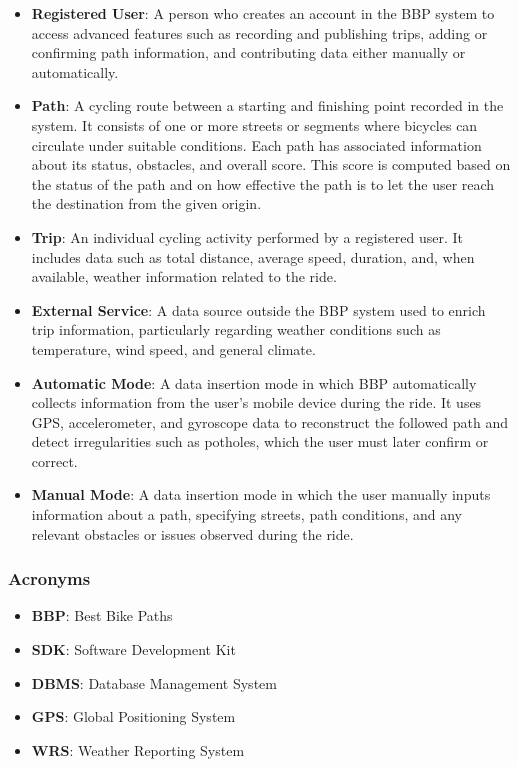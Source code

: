 \begin{itemize}
    \item \textbf{Registered User}: A person who creates an account in the BBP system to access advanced features such as recording and publishing trips, adding or confirming path information, and contributing data either manually or automatically.
    \item \textbf{Path}: A cycling route between a starting and finishing point recorded in the system. It consists of one or more streets or segments where bicycles can circulate under suitable conditions. Each path has associated information about its status, obstacles, and overall score. This score is computed based on the status of the path and on how effective the path is to let the user reach the destination from the given origin.
    \item \textbf{Trip}: An individual cycling activity performed by a registered user. It includes data such as total distance, average speed, duration, and, when available, weather information related to the ride.
    \item \textbf{External Service}: A data source outside the BBP system used to enrich trip information, particularly regarding weather conditions such as temperature, wind speed, and general climate.
    \item \textbf{Automatic Mode}: A data insertion mode in which BBP automatically collects information from the user’s mobile device during the ride. It uses GPS, accelerometer, and gyroscope data to reconstruct the followed path and detect irregularities such as potholes, which the user must later confirm or correct.
    \item \textbf{Manual Mode}: A data insertion mode in which the user manually inputs information about a path, specifying streets, path conditions, and any relevant obstacles or issues observed during the ride.
\end{itemize}

\subsubsection{Acronyms}

\begin{itemize}
    \item \textbf{BBP}: Best Bike Paths
    \item \textbf{SDK}: Software Development Kit
    \item \textbf{DBMS}: Database Management System
    \item \textbf{GPS}: Global Positioning System
    \item \textbf{WRS}: Weather Reporting System
\end{itemize}


